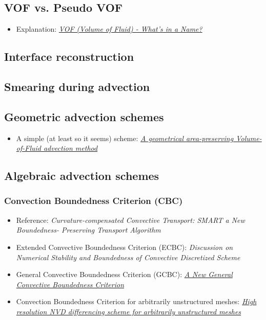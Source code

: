 \documentclass[]{report}
\begin{document}
\subsection{VOF vs. Pseudo VOF}

\begin{itemize}
    \item Explanation: \textit{\href{http://www.flow3d.com/cfd-101/cfd-101-VOF.html}{VOF (Volume of Fluid) - What's in a Name?}}
\end{itemize}

\subsection{Interface reconstruction}

\subsection{Smearing during advection}

\subsection{Geometric advection schemes}

\begin{itemize}
    \item A simple (at least so it seems) scheme: \textit{\href{http://www.lmm.jussieu.fr/~zaleski/nota02.pdf}{A geometrical area-preserving Volume-of-Fluid advection method}}
\end{itemize}

\subsection{Algebraic advection schemes}

\subsubsection{Convection Boundedness Criterion (CBC)}

\sloppy
\begin{itemize}
    \item Reference: \textit{Curvature-compensated Convective Transport: SMART a New Boundedness- Preserving Transport Algorithm}
    \item Extended Convective Boundedness Criterion (ECBC): \textit{Discussion on Numerical Stability and Boundedness of Convective Discretized Scheme}
    \item General Convective Boundedness Criterion (GCBC): \textit{\href{http://gr.xjtu.edu.cn:8080/upload/PUB.1673.4/Wei_NHT.pdf}{A New General Convective Boundedness Criterion}}
    \item Convection Boundedness Criterion for arbitrarily unstructured meshes: \textit{\href{http://powerlab.fsb.hr/ped/kturbo/openfoam/papers/GammaPaper.pdf}{High resolution NVD differencing scheme for arbitrarily unstructured meshes}}
\end{itemize}
\fussy
\end{document}
